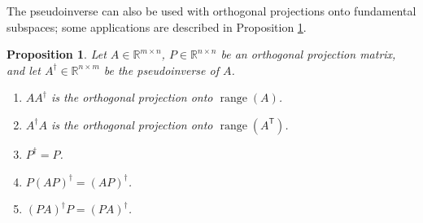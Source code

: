 \documentclass[12pt]{article}
\newcommand{\trans}[1]{{#1}^\mathsf{T}}	%
\newcommand{\pinv}[1]{{#1}^\dagger}	%
\DeclareMathOperator{\range}{range}	%
\newtheorem{proposition}{Proposition}[section]
\begin{document}
\noindent The pseudoinverse can also be used with orthogonal projections onto fundamental subspaces; some applications are described in Proposition \ref{prop:Subspace projections}.

\begin{proposition}
\label{prop:Subspace projections}
Let $A \in \mathbb{R}^{m \times n}$, $P \in \mathbb{R}^{n \times n}$ be an orthogonal projection matrix, and let $\pinv{A} \in \mathbb{R}^{n \times m}$ be the pseudoinverse of $A$.
\begin{enumerate}[label={(\roman*)}]
    \item $A\pinv{A}$ is the orthogonal projection onto $\range(A)$. \label{prop:Range projector}
    \item $\pinv{A}A$ is the orthogonal projection onto $\range\left(\trans{A}\right)$. \label{prop:Transpose range projector}
    \item $\pinv{P} = P$. \label{prop:Projection pseudoinverse}
    \item $P\pinv{\left(AP\right)} = \pinv{\left(AP\right)}$. \label{prop:Left projection}
    \item $\pinv{\left(PA\right)}P = \pinv{\left(PA\right)}$. \label{prop:Right projection}
\end{enumerate}
\end{proposition}
\end{document}
